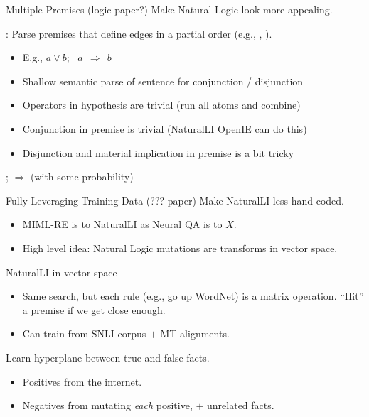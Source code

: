 \begin{frame}{Multiple Premises (logic paper?)}
 Make Natural Logic look more appealing.
\vspace{1em}
\pause

:
  Parse premises that define edges in a partial order
   (e.g., , ).
\vspace{1em}
\pause

\begin{itemize}
  \item E.g., $a \lor b; \lnot a ~~\Rightarrow~~ b$
  \pause
  \item Shallow semantic parse of sentence for conjunction / disjunction
  \pause
  \item Operators in hypothesis are trivial (run all atoms and combine)
  \item Conjunction in premise is trivial (NaturalLI OpenIE can do this)
  \item Disjunction and material implication in premise is a bit tricky
\end{itemize}
\vspace{1em}
\pause

  ;  $\Rightarrow$
   (with some probability)
\end{frame}


\begin{frame}{Fully Leveraging Training Data (??? paper)}
 Make NaturalLI less hand-coded.
\vspace{0.5em}
\pause

\begin{itemize}
  \item MIML-RE is to NaturalLI as Neural QA is to $X$.
  \item High level idea: Natural Logic mutations are transforms in
        vector space.
\end{itemize}
\vspace{0.5em}
\pause

 NaturalLI in vector space
\begin{itemize}
  \item Same search, but each rule (e.g., go up WordNet) is a matrix operation.
        ``Hit'' a premise if we get close enough.
  \item Can train from SNLI corpus $+$ MT alignments.
\end{itemize}
\vspace{0.5em}
\pause

 Learn hyperplane between true and false facts.
\begin{itemize}
  \item Positives from the internet.
  \item Negatives from mutating \textit{each} positive, $+$
        unrelated facts.
\end{itemize}

\end{frame}
